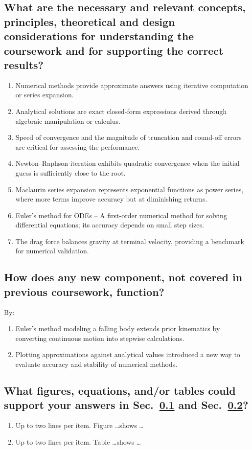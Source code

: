 \subsection{What are the necessary and relevant concepts, principles, theoretical and design considerations for understanding the coursework and for supporting the correct results?}
\label{sec:nrcp}
\begin{enumerate}
\item Numerical methods provide approximate answers using iterative computation or series expansion.
\item Analytical solutions are exact closed-form expressions derived through algebraic manipulation or calculus.
\item Speed of convergence and the magnitude of truncation and round-off errors are critical for assessing the performance.
\item Newton–Raphson iteration exhibits quadratic convergence when the initial guess is sufficiently close to the root.
\item Maclaurin series expansion represents exponential functions as power series, where more terms improve accuracy but at diminishing returns.
\item Euler’s method for ODEs – A first-order numerical method for solving differential equations; its accuracy depends on small step sizes.
\item The drag force balances gravity at terminal velocity, providing a benchmark for numerical validation.
\end{enumerate}

\subsection{How does any new component, not covered in previous coursework, function?}
\label{sec:nfxn}
By:
\begin{enumerate}
\item Euler’s method modeling a falling body extends prior kinematics by converting continuous motion into stepwise calculations.
\item Plotting approximations against analytical values introduced a new way to evaluate accuracy and stability of numerical methods.
\end{enumerate}
	
\subsection{What figures, equations, and/or tables could support your answers in Sec.~\ref{sec:nrcp} and Sec.~\ref{sec:nfxn}?}
\begin{enumerate}
\item Up to two lines per item. Figure \ldots shows \ldots
\item Up to two lines per item. Table \ldots shows \ldots
\end{enumerate}
	
